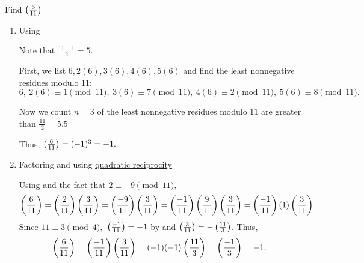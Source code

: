 \documentclass[letterpaper, 11 pt]{ximera}
\begin{document}
\begin{example}
	Find $\left(\frac{6}{11}\right)$ 
		
	\begin{enumerate}
		\item Using 
		\begin{solution}
			Note that $\frac{11-1}{2}=5$.

			First, we list $6,2(6),3(6),4(6),5(6)$ and find the least nonnegative residues modulo $11:$
			\[ 6,\ 2(6)\equiv 1\pmod{11},\ 3(6)\equiv 7\pmod{11},
			\ 4(6)\equiv 2\pmod{11},\ 5(6)\equiv 8\pmod{11}. \]

			Now we count $n=3$ of the least nonnegative residues modulo $11$ are greater than $\frac{11}{2}=5.5$

			Thus, $\left(\frac{6}{11}\right)=(-1)^3=-1.$
		\end{solution}

		\item Factoring and using \hyperref[quad-rec-standard-form]{quadratic reciprocity}
			
		\begin{solution}
			Using  and the fact that $2\equiv -9\pmod{11},$ 
			\begin{align*}
				\left(\frac{6}{11}\right)&=\left(\frac{2}{11}\right)\left(\frac{3}{11}\right)
					=\left(\frac{-9}{11}\right)\left(\frac{3}{11}\right)=\left(\frac{-1}{11}\right)\left(\frac{9}{11}\right)\left(\frac{3}{11}\right)=\left(\frac{-1}{11}\right)(1)\left(\frac{3}{11}\right)
			\end{align*}
			Since $11\equiv 3\pmod{4},$ $\left(\frac{-1}{11}\right)=-1$ by  and $\left(\frac{3}{11}\right)=-\left(\frac{11}{3}\right)$. Thus, 
			\begin{align*}
				\left(\frac{6}{11}\right)&=\left(\frac{-1}{11}\right)\left(\frac{3}{11}\right)=(-1)(-1)\left(\frac{11}{3}\right)=\left(\frac{-1}{3}\right)=-1.
			\end{align*}
		\end{solution}
	\end{enumerate}
\end{example}
\end{document}
